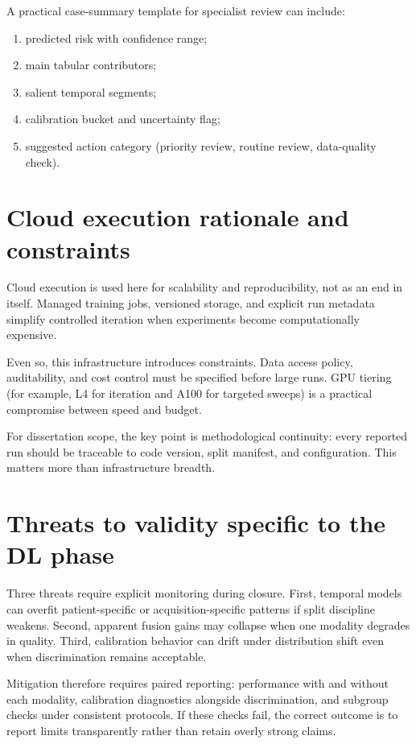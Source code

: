 A practical case-summary template for specialist review can include:
\begin{enumerate}[leftmargin=1.2cm]
    \item predicted risk with confidence range;
    \item main tabular contributors;
    \item salient temporal segments;
    \item calibration bucket and uncertainty flag;
    \item suggested action category (priority review, routine review, data-quality check).
\end{enumerate}

\section{Cloud execution rationale and constraints}
Cloud execution is used here for scalability and reproducibility, not as an end in itself. Managed training jobs, versioned storage, and explicit run metadata simplify controlled iteration when experiments become computationally expensive.

Even so, this infrastructure introduces constraints. Data access policy, auditability, and cost control must be specified before large runs. GPU tiering (for example, L4 for iteration and A100 for targeted sweeps) is a practical compromise between speed and budget.

For dissertation scope, the key point is methodological continuity: every reported run should be traceable to code version, split manifest, and configuration. This matters more than infrastructure breadth.

\section{Threats to validity specific to the DL phase}
Three threats require explicit monitoring during closure. First, temporal models can overfit patient-specific or acquisition-specific patterns if split discipline weakens. Second, apparent fusion gains may collapse when one modality degrades in quality. Third, calibration behavior can drift under distribution shift even when discrimination remains acceptable.

Mitigation therefore requires paired reporting: performance with and without each modality, calibration diagnostics alongside discrimination, and subgroup checks under consistent protocols. If these checks fail, the correct outcome is to report limits transparently rather than retain overly strong claims.

